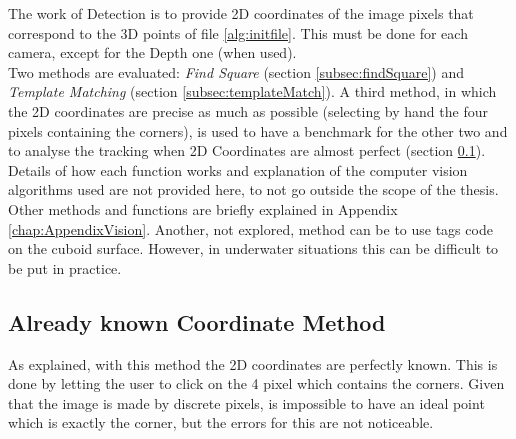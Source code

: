 The work of Detection is to provide 2D coordinates of the image pixels that correspond to the 3D points of file \ref{alg:initfile}. This must be done for each camera, except for the Depth one (when used).\\
Two methods are evaluated: \textit{Find Square} (section \ref{subsec:findSquare}) and \textit{Template Matching} (section \ref{subsec:templateMatch}). A third method, in which the 2D coordinates are precise as much as possible (selecting by hand the four pixels containing the corners), is used to have a benchmark for the other two and to analyse the tracking when 2D Coordinates are almost perfect (section \ref{subsec:clickMethod}).\\
Details of how each function works and explanation of the computer vision algorithms used are not provided here, to not go outside the scope of the thesis.\\
Other methods and functions are briefly explained in Appendix \ref{chap:AppendixVision}. Another, not explored, method can be to use tags code on the cuboid surface. However, in underwater situations this can be difficult to be put in practice.

\subsection{Already known Coordinate Method}
\label{subsec:clickMethod}
As explained, with this method the 2D coordinates are perfectly known. This is done by letting the user to click on the 4 pixel which contains the corners. Given that the image is made by discrete pixels, is impossible to have an ideal point which is exactly the corner, but the errors for this are not noticeable.

